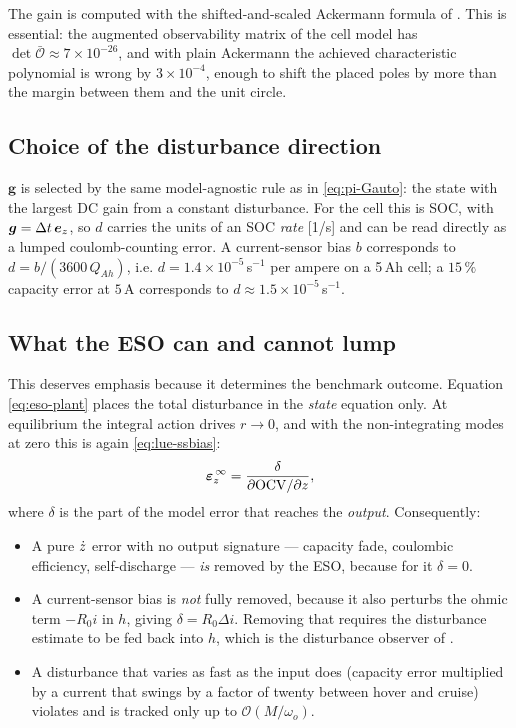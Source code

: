 The gain is computed with the shifted-and-scaled Ackermann formula of .  This
is essential: the augmented observability matrix of the cell model has
$\det\bar{\mathcal{O}}\approx 7\times10^{-26}$, and with plain Ackermann the achieved
characteristic polynomial is wrong by $3\times10^{-4}$, enough to shift the placed poles by more
than the margin between them and the unit circle.

\subsection{Choice of the disturbance direction}
$\bm{g}$ is selected by the same model-agnostic rule as in \eqref{eq:pi-Gauto}: the state with the
largest DC gain from a constant disturbance.  For the cell this is SOC, with
$\bm{g} = \Delta t\,\bm{e}_{z}$, so $d$ carries the units of an SOC \emph{rate} [1/s] and can be
read directly as a lumped coulomb-counting error.  A current-sensor bias $b$ corresponds to
$d = b/(3600\,Q_{Ah})$, i.e. $d = 1.4\times10^{-5}$\,s$^{-1}$ per ampere on a 5\,Ah cell; a
$15\,\%$ capacity error at $5$\,A corresponds to $d\approx1.5\times10^{-5}$\,s$^{-1}$.

\subsection{What the ESO can and cannot lump}
\label{sec:eso-limits}
This deserves emphasis because it determines the benchmark outcome.  Equation
\eqref{eq:eso-plant} places the total disturbance in the \emph{state} equation only.  At
equilibrium the integral action drives $r\to0$, and with the non-integrating modes at zero this
is again \eqref{eq:lue-ssbias}:
\begin{equation}
\bm{\varepsilon}_{z}^{\,\infty} = \frac{\delta}{\partial\mathrm{OCV}/\partial z} ,
\label{eq:eso-ssbias}
\end{equation}
where $\delta$ is the part of the model error that reaches the \emph{output}.  Consequently:
\begin{itemize}[nosep]
\item A pure $\dot{z}$ error with no output signature --- capacity fade, coulombic efficiency,
self-discharge --- \emph{is} removed by the ESO, because for it $\delta = 0$.
\item A current-sensor bias is \emph{not} fully removed, because it also perturbs the ohmic term
$-R_0 i$ in $h$, giving $\delta = R_0\Delta i$.  Removing that requires the disturbance estimate
to be fed back into $h$, which is the disturbance observer of .
\item A disturbance that varies as fast as the input does (capacity error multiplied by a current
that swings by a factor of twenty between hover and cruise) violates  and is
tracked only up to $\mathcal{O}(M/\omega_o)$.
\end{itemize}


